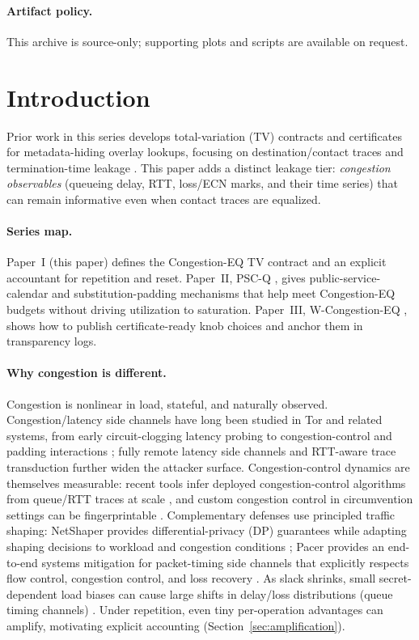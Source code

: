 \documentclass[11pt]{article}
\theoremstyle{definition}
\theoremstyle{remark}
\begin{document}
\paragraph{Artifact policy.}
This archive is source-only; supporting plots and scripts are available on request.\cite{series:artifactpolicy}


\section{Introduction}
Prior work in this series develops total-variation (TV) contracts and certificates for metadata-hiding overlay lookups, focusing on destination/contact traces and termination-time leakage \cite{series:schedcompiler,series:knapsacktransport}.
This paper adds a distinct leakage tier: \emph{congestion observables} (queueing delay, RTT, loss/ECN marks, and their time series) that can remain informative even when contact traces are equalized.

\paragraph{Series map.}
Paper~I (this paper) defines the Congestion-EQ TV contract and an explicit accountant for repetition and reset.
Paper~II, PSC-Q \cite{series:pscq}, gives public-service-calendar and substitution-padding mechanisms that help meet Congestion-EQ budgets without driving utilization to saturation.
Paper~III, W-Congestion-EQ \cite{series:wcongeq}, shows how to publish certificate-ready knob choices and anchor them in transparency logs.

\paragraph{Why congestion is different.}
Congestion is nonlinear in load, stateful, and naturally observed.
Congestion/latency side channels have long been studied in Tor and related systems, from early circuit-clogging latency probing \cite{murdoch_danezis2005,latencyleak,congestion_longpaths} to congestion-control and padding interactions \cite{defenestrator,tor324}; fully remote latency side channels \cite{snailload,zeroclicksnailload} and RTT-aware trace transduction \cite{cellshift2026} further widen the attacker surface.
Congestion-control dynamics are themselves measurable: recent tools infer deployed congestion-control algorithms from queue/RTT traces at scale \cite{nebby2024,ccanalyzer2024}, and custom congestion control in circumvention settings can be fingerprintable \cite{customcc_foci2025}.
Complementary defenses use principled traffic shaping: NetShaper provides differential-privacy (DP) guarantees while adapting shaping decisions to workload and congestion conditions \cite{netshaper2024}; Pacer provides an end-to-end systems mitigation for packet-timing side channels that explicitly respects flow control, congestion control, and loss recovery \cite{pacer2022}. 
As slack shrinks, small secret-dependent load biases can cause large shifts in delay/loss distributions (queue timing channels) \cite{bitsqueues,gong2014timing,beams2021}.
Under repetition, even tiny per-operation advantages can amplify, motivating explicit accounting (Section~\ref{sec:amplification}).
\end{document}

